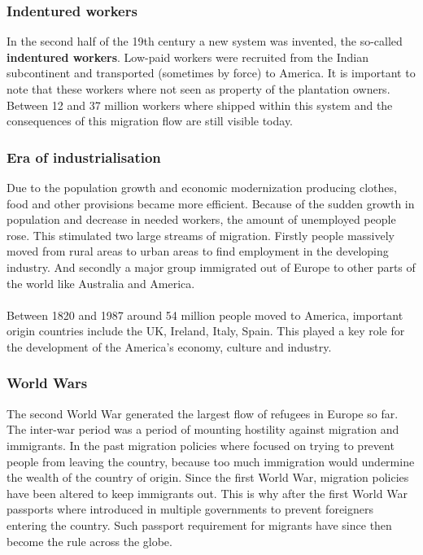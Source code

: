 \documentclass[../summary.tex]{subfiles}
\begin{document}
	\subsubsection{Indentured workers}
	In the second half of the 19th century a new system was invented, the so-called \textbf{indentured workers}. Low-paid workers were recruited from the Indian subcontinent and transported (sometimes by force) to America. It is important to note that these workers where not seen as property of the plantation owners. Between 12 and 37 million workers where shipped within this system and the consequences of this migration flow are still visible today.
	
	\subsubsection{Era of industrialisation}
	Due to the population growth and economic modernization producing clothes, food and other provisions became more efficient. Because of the sudden growth in population and decrease in needed workers, the amount of unemployed people rose. This stimulated two large streams of migration. Firstly people massively moved from rural areas to urban areas to find employment in the developing industry. And secondly a major group immigrated out of Europe to other parts of the world like Australia and America. 
	\\\\
	Between 1820 and 1987 around 54 million people moved to America, important origin countries include the UK, Ireland, Italy, Spain. This played a key role for the development of the America's economy, culture and industry. 
	\newpage
	
	\subsubsection{World Wars}
	The second World War generated the largest flow of refugees in Europe so far. The inter-war period was a period of mounting hostility against migration and immigrants. In the past migration policies where focused on trying to prevent people from leaving the country, because too much immigration would undermine the wealth of the country of origin. Since the first World War, migration policies have been altered to keep immigrants out. This is why after the first World War passports where introduced in multiple governments to prevent foreigners entering the country. Such passport requirement for migrants have since then become the rule across the globe.
	
\end{document}
